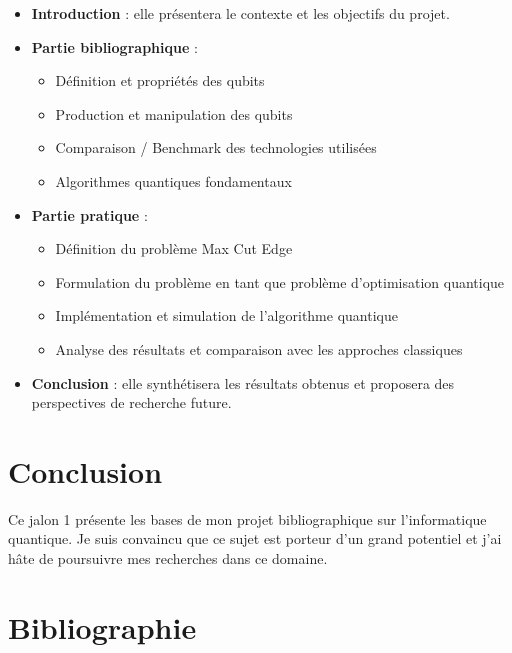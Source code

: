 \documentclass[12pt]{article}
\begin{document}
\begin{itemize}
    \item \textbf{Introduction} : elle présentera le contexte et les objectifs du projet.
    \item \textbf{Partie bibliographique} :
        \begin{itemize}
            \item Définition et propriétés des qubits
            \item Production et manipulation des qubits
            \item Comparaison / Benchmark des technologies utilisées
            \item Algorithmes quantiques fondamentaux
        \end{itemize}
    \item \textbf{Partie pratique} :
        \begin{itemize}
            \item Définition du problème Max Cut Edge
            \item Formulation du problème en tant que problème d'optimisation quantique
            \item Implémentation et simulation de l'algorithme quantique
            \item Analyse des résultats et comparaison avec les approches classiques
        \end{itemize}
    \item \textbf{Conclusion} : elle synthétisera les résultats obtenus et proposera des perspectives de recherche future.
\end{itemize}

\section{Conclusion}

Ce jalon 1 présente les bases de mon projet bibliographique sur l'informatique quantique. Je suis convaincu que ce sujet est porteur d'un grand potentiel et j'ai hâte de poursuivre mes recherches dans ce domaine.

\section*{Bibliographie}
\end{document}

